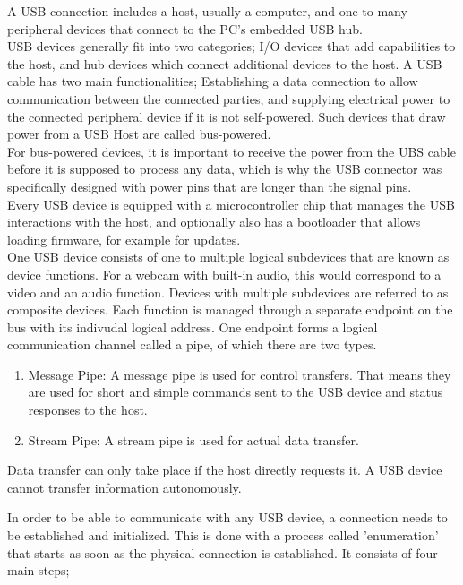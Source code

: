 A USB connection includes a host, usually a computer, and one to many peripheral devices that connect to the PC's embedded USB hub.  \\
USB devices generally fit into two categories; I/O devices that add capabilities to the host, and hub devices which connect additional devices to the host. A USB cable has two main functionalities; Establishing a data connection to allow communication between the connected parties, and supplying electrical power to the connected peripheral device if it is not self-powered. Such devices that draw power from a USB Host are called bus-powered. \\ 
For bus-powered devices, it is important to receive the power from the UBS cable before it is supposed to process any data, which is why the USB connector was specifically designed with power pins that are longer than the signal pins.\\
Every USB device is equipped with a microcontroller chip that manages the USB interactions with the host, and optionally also has a bootloader that allows loading firmware, for example for updates. \\
One USB device consists of one to multiple logical subdevices that are known as device functions. For a webcam with built-in audio, this would correspond to a video and an audio function. Devices with multiple subdevices are referred to as composite devices. Each function is managed through a separate endpoint on the bus with its indivudal logical address. One endpoint forms a logical communication channel called a pipe, of which there are two types.  
\begin{enumerate}
    \item Message Pipe: A message pipe is used for control transfers. That means they are used for short and simple commands sent to the USB device and status responses to the host.
    \item Stream Pipe: A stream pipe is used for actual data transfer.
\end{enumerate}
Data transfer can only take place if the host directly requests it. A USB device cannot transfer information autonomously. 

In order to be able to communicate with any USB device, a connection needs to be established and initialized. This is done with a process called 'enumeration' that starts as soon as the physical connection is established. It consists of four main steps;

